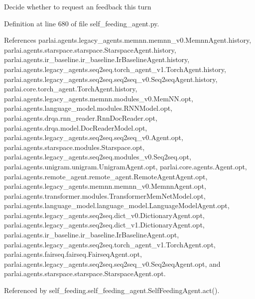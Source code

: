 \begin{DoxyVerb}Decide whether to request an feedback this turn\end{DoxyVerb}
 

Definition at line 680 of file self\+\_\+feeding\+\_\+agent.\+py.



References parlai.\+agents.\+legacy\+\_\+agents.\+memnn.\+memnn\+\_\+v0.\+Memnn\+Agent.\+history, parlai.\+agents.\+starspace.\+starspace.\+Starspace\+Agent.\+history, parlai.\+agents.\+ir\+\_\+baseline.\+ir\+\_\+baseline.\+Ir\+Baseline\+Agent.\+history, parlai.\+agents.\+legacy\+\_\+agents.\+seq2seq.\+torch\+\_\+agent\+\_\+v1.\+Torch\+Agent.\+history, parlai.\+agents.\+legacy\+\_\+agents.\+seq2seq.\+seq2seq\+\_\+v0.\+Seq2seq\+Agent.\+history, parlai.\+core.\+torch\+\_\+agent.\+Torch\+Agent.\+history, parlai.\+agents.\+legacy\+\_\+agents.\+memnn.\+modules\+\_\+v0.\+Mem\+N\+N.\+opt, parlai.\+agents.\+language\+\_\+model.\+modules.\+R\+N\+N\+Model.\+opt, parlai.\+agents.\+drqa.\+rnn\+\_\+reader.\+Rnn\+Doc\+Reader.\+opt, parlai.\+agents.\+drqa.\+model.\+Doc\+Reader\+Model.\+opt, parlai.\+agents.\+legacy\+\_\+agents.\+seq2seq.\+seq2seq\+\_\+v0.\+Agent.\+opt, parlai.\+agents.\+starspace.\+modules.\+Starspace.\+opt, parlai.\+agents.\+legacy\+\_\+agents.\+seq2seq.\+modules\+\_\+v0.\+Seq2seq.\+opt, parlai.\+agents.\+unigram.\+unigram.\+Unigram\+Agent.\+opt, parlai.\+core.\+agents.\+Agent.\+opt, parlai.\+agents.\+remote\+\_\+agent.\+remote\+\_\+agent.\+Remote\+Agent\+Agent.\+opt, parlai.\+agents.\+legacy\+\_\+agents.\+memnn.\+memnn\+\_\+v0.\+Memnn\+Agent.\+opt, parlai.\+agents.\+transformer.\+modules.\+Transformer\+Mem\+Net\+Model.\+opt, parlai.\+agents.\+language\+\_\+model.\+language\+\_\+model.\+Language\+Model\+Agent.\+opt, parlai.\+agents.\+legacy\+\_\+agents.\+seq2seq.\+dict\+\_\+v0.\+Dictionary\+Agent.\+opt, parlai.\+agents.\+legacy\+\_\+agents.\+seq2seq.\+dict\+\_\+v1.\+Dictionary\+Agent.\+opt, parlai.\+agents.\+ir\+\_\+baseline.\+ir\+\_\+baseline.\+Ir\+Baseline\+Agent.\+opt, parlai.\+agents.\+legacy\+\_\+agents.\+seq2seq.\+torch\+\_\+agent\+\_\+v1.\+Torch\+Agent.\+opt, parlai.\+agents.\+fairseq.\+fairseq.\+Fairseq\+Agent.\+opt, parlai.\+agents.\+legacy\+\_\+agents.\+seq2seq.\+seq2seq\+\_\+v0.\+Seq2seq\+Agent.\+opt, and parlai.\+agents.\+starspace.\+starspace.\+Starspace\+Agent.\+opt.



Referenced by self\+\_\+feeding.\+self\+\_\+feeding\+\_\+agent.\+Self\+Feeding\+Agent.\+act().

